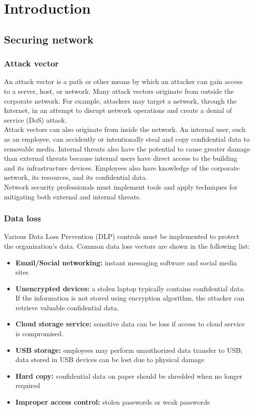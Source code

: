 \chapter{Introduction}

\section{Securing network}

\subsection{Attack vector}

An attack vector is a path or other means by which an attacker can gain access to a server, host, or network. Many attack vectors originate from outside the corporate network. For example, attackers may target a network, through the Internet, in an attempt to disrupt network operations and create a denial of service (DoS) attack.\\

Attack vectors can also originate from inside the network. An internal user, such as an employee, can accidently or intentionally steal and copy confidential data to removable media. Internal threats also have the potential to cause greater damage than external threats because internal users have direct access to the building and its infrastructure devices. Employees also have knowledge of the corporate network, its resources, and its confidential data.\\

Network security professionals must implement tools and apply techniques for mitigating both external and internal threats.

\subsection{Data loss}

Various Data Loss Prevention (DLP) controls must be implemented to protect the organization's data. Common data loss vectors are shown in the following list:

\begin{itemize}
\item \textbf{Email/Social networking:} instant messaging software and social media sites
\item \textbf{Unencrypted devices:} a stolen laptop typically contains confidential data. If the information is not stored using encryption algorithm, the attacker can retrieve valuable confidential data.
\item \textbf{Cloud storage service:} sensitive data can be loss if access to cloud service is compromised.
\item \textbf{USB storage:} employees may perform unauthorized data transfer to USB; data stored in USB devices can be lost due to physical damage
\item \textbf{Hard copy:} confidential data on paper should be shredded when no longer required
\item \textbf{Improper access control:} stolen passwords or weak passwords
\end{itemize}

